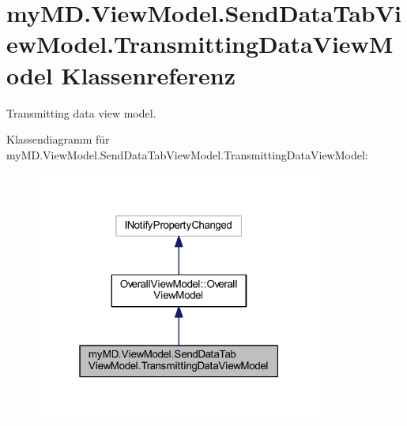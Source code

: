 \hypertarget{classmy_m_d_1_1_view_model_1_1_send_data_tab_view_model_1_1_transmitting_data_view_model}{}\section{my\+M\+D.\+View\+Model.\+Send\+Data\+Tab\+View\+Model.\+Transmitting\+Data\+View\+Model Klassenreferenz}
\label{classmy_m_d_1_1_view_model_1_1_send_data_tab_view_model_1_1_transmitting_data_view_model}


Transmitting data view model.  




Klassendiagramm für my\+M\+D.\+View\+Model.\+Send\+Data\+Tab\+View\+Model.\+Transmitting\+Data\+View\+Model\+:\nopagebreak
\begin{figure}[H]
\begin{center}
\leavevmode
\includegraphics[width=268pt]{classmy_m_d_1_1_view_model_1_1_send_data_tab_view_model_1_1_transmitting_data_view_model__inherit__graph}
\end{center}
\end{figure}


